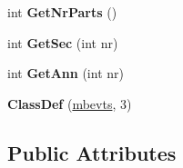\begin{DoxyCompactItemize}
\mbox{\label{classmbevts_aa68e7ed695cb268d8ab70bb3fda5740c}} 
int {\bfseries Get\+Nr\+Parts} ()
\item 
\mbox{\label{classmbevts_ac000de59a0294db6cabb283288c086ed}} 
int {\bfseries Get\+Sec} (int nr)
\item 
\mbox{\label{classmbevts_a08d777dc8c5cdf6d51fbe0ca6d111870}} 
int {\bfseries Get\+Ann} (int nr)
\item 
\mbox{\label{classmbevts_acd52cb238ea4a902fde6906f1a60f30a}} 
{\bfseries Class\+Def} (\hyperlink{classmbevts}{mbevts}, 3)
\end{DoxyCompactItemize}
\subsection*{Public Attributes}
